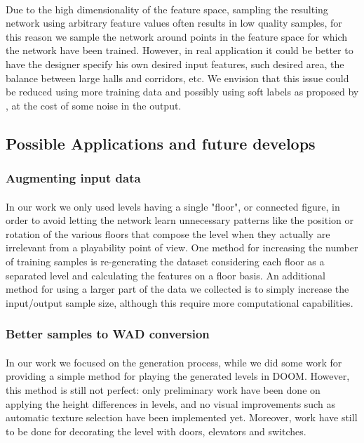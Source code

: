 \paragraph{} Due to the high dimensionality of the feature space, sampling the resulting network using arbitrary feature values often results in low quality samples, for this reason we sample the network around points in the feature space for which the network have been trained. However, in real application it could be better to have the designer specify his own desired input features, such desired area, the balance between large halls and corridors, etc. We envision that this issue could be reduced using more training data and possibly using soft labels as proposed by \cite{improved_gan}, at the cost of some noise in the output.

\subsection{Possible Applications and future develops}
\subsubsection{Augmenting input data}
\label{sec:data-augmentation}
\paragraph{} In our work we only used levels having a single "floor", or connected figure, in order to avoid letting the network learn unnecessary patterns like the position or rotation of the various floors that compose the level when they actually are irrelevant from a playability point of view. One method for increasing the number of training samples is re-generating the dataset considering each floor as a separated level and calculating the features on a floor basis. An additional method for using a larger part of the data we collected is to simply increase the input/output sample size, although this require more computational capabilities. 

\subsubsection{Better samples to WAD conversion}
\paragraph{} In our work we focused on the generation process, while we did some work for providing a simple method for playing the generated levels in DOOM. However, this method is still not perfect: only preliminary work have been done on applying the height differences in levels, and no visual improvements such as automatic texture selection have been implemented yet. Moreover, work have still to be done for decorating the level with doors, elevators and switches. 

